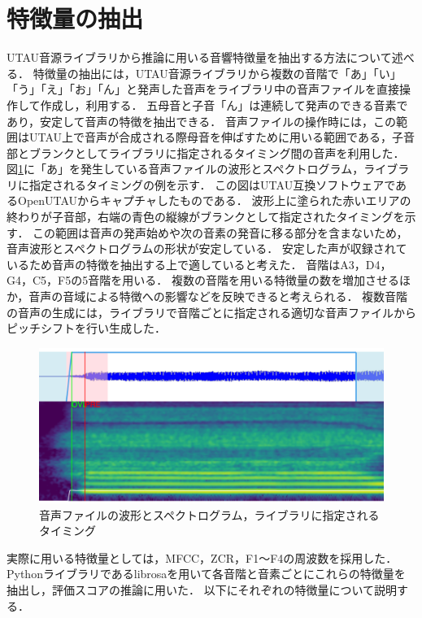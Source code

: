 \section{特徴量の抽出}
\label{sec:feature}

UTAU音源ライブラリから推論に用いる音響特徴量を抽出する方法について述べる．
特徴量の抽出には，UTAU音源ライブラリから複数の音階で「あ」「い」「う」「え」「お」「ん」と発声した音声をライブラリ中の音声ファイルを直接操作して作成し，利用する．
五母音と子音「ん」は連続して発声のできる音素であり，安定して音声の特徴を抽出できる．
音声ファイルの操作時には，この範囲はUTAU上で音声が合成される際母音を伸ばすために用いる範囲である，子音部とブランクとしてライブラリに指定されるタイミング間の音声を利用した．
図\ref{fig:waveform}に「あ」を発生している音声ファイルの波形とスペクトログラム，ライブラリに指定されるタイミングの例を示す．
この図はUTAU互換ソフトウェアであるOpenUTAUからキャプチャしたものである．
波形上に塗られた赤いエリアの終わりが子音部，右端の青色の縦線がブランクとして指定されたタイミングを示す．
この範囲は音声の発声始めや次の音素の発音に移る部分を含まないため，音声波形とスペクトログラムの形状が安定している．
安定した声が収録されているため音声の特徴を抽出する上で適していると考えた．
音階はA3，D4，G4，C5，F5の5音階を用いる．
複数の音階を用いる特徴量の数を増加させるほか，音声の音域による特徴への影響などを反映できると考えられる．
複数音階の音声の生成には，ライブラリで音階ごとに指定される適切な音声ファイルからピッチシフトを行い生成した．

\begin{figure}[htb]
  \centering
  \includegraphics[width=0.9\linewidth]{fig/eve_a.png}
  \caption{音声ファイルの波形とスペクトログラム，ライブラリに指定されるタイミング}
  \label{fig:waveform}
\end{figure}

実際に用いる特徴量としては，MFCC，ZCR，F1〜F4の周波数を採用した．
Pythonライブラリであるlibrosaを用いて各音階と音素ごとにこれらの特徴量を抽出し，評価スコアの推論に用いた．
以下にそれぞれの特徴量について説明する．

